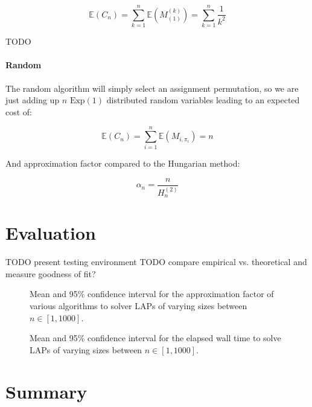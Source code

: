 \documentclass{article}
\newcommand{\expected}[1]{\mathbb{E} \left ( #1 \right )}
\newcommand{\exprv}[1]{\text{Exp} \left( #1 \right )}
\begin{document}
\begin{equation}
	\expected{C_n} = \sum_{k = 1}^{n} \expected{ M^{(k)}_{(1)} } = \sum_{k = 1}^{n} \frac{1}{k^2} 
\end{equation}

TODO 

\paragraph{Random}

The random algorithm will simply select an assignment permutation, so we are just adding up $n$ $\exprv{1}$ distributed random variables leading to an expected cost of: 

\begin{equation}
	\expected{C_n} = \sum_{i=1}^n \expected{ M_{i, \pi_i} } = n
\end{equation}

And approximation factor compared to the Hungarian method:

\begin{equation}
	\alpha_n = \frac{n}{H_n^{(2)}}
\end{equation}

\section{Evaluation}

TODO present testing environment
TODO compare empirical vs. theoretical and measure goodness of fit?

\begin{multicols}{2}
\begin{figure}[H]
	\centering
	\resizebox{\linewidth}{!}{}
	\caption{Mean and 95\% confidence interval for the approximation factor of various algorithms to solver LAPs of varying sizes between $n \in [1, 1000]$.}
	\label{fig:approximationFactor}
\end{figure}

\columnbreak

\begin{figure}[H]
	\centering
	\resizebox{\linewidth}{!}{}
	\caption{Mean and 95\% confidence interval for the elapsed wall time to solve LAPs of varying sizes between $n \in [1, 1000]$.}
	\label{fig:runtime}
\end{figure}
\end{multicols}

\section{Summary}
\end{document}
